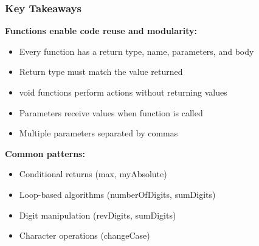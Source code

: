 \documentclass{beamer}
\begin{document}
\begin{frame}
\frametitle{Key Takeaways}
\textbf{Functions enable code reuse and modularity:}
\begin{itemize}
    \item Every function has a return type, name, parameters, and body
    \item Return type must match the value returned
    \item void functions perform actions without returning values
    \item Parameters receive values when function is called
    \item Multiple parameters separated by commas
\end{itemize}
\pause

\textbf{Common patterns:}
\begin{itemize}
    \item Conditional returns (max, myAbsolute)
    \item Loop-based algorithms (numberOfDigits, sumDigits)
    \item Digit manipulation (revDigits, sumDigits)
    \item Character operations (changeCase)
\end{itemize}
\end{frame}
\end{document}
